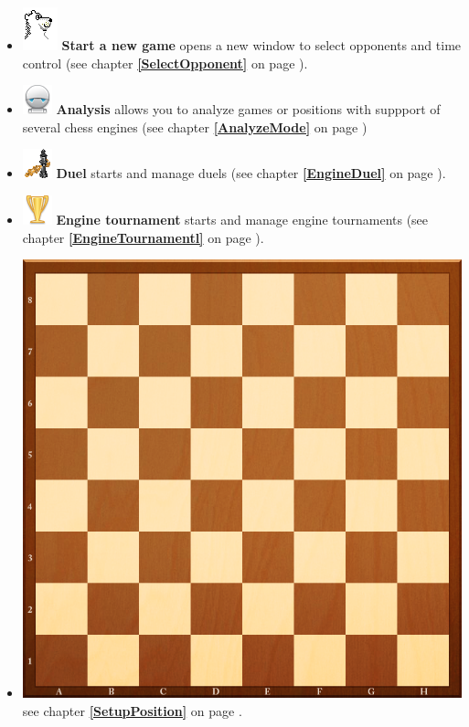 \documentclass[11pt,a4paper]{article}
\begin{document}
\begin{itemize}
	\item \includegraphics[scale=0.6]{BearChessIcon.png} \textbf{Start a new game} opens a new window to select opponents and time control (see chapter \textbf{\ref{SelectOpponent}  } on page \pageref{SelectOpponent}).
	
	\item \includegraphics[scale=0.5]{robot.png} \textbf{Analysis} allows you to analyze games or positions with suppport of several chess engines (see chapter \textbf{\ref{AnalyzeMode}  } on page \pageref{AnalyzeMode})
	
	\item \includegraphics[scale=0.5]{6-2-chess-png.png} \textbf{Duel} starts and manage duels (see chapter  \textbf{\ref{EngineDuel}  } on page \pageref{EngineDuel} ).
	
	\item \includegraphics[scale=0.5]{cup_gold.png} \textbf{Engine tournament} starts and manage engine tournaments (see chapter  \textbf{\ref{EngineTournamentl}  } on page \pageref{EngineTournamentl} ).
	
	\item \includegraphics[scale=0.03]{Chess_Board.png} see chapter \textbf{\ref{SetupPosition}  } on page \pageref{SetupPosition}.
	

\end{itemize}
\end{document}

